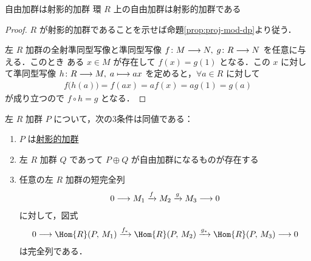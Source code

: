 \documentclass[algtopo_main]{subfiles}
\begin{document}
\begin{mycol}[label=col:free-proj]{自由加群は射影的加群}
    環 $R$ 上の自由加群は射影的加群である
\end{mycol}

\begin{proof}
    $R$ が射影的加群であることを示せば命題\ref{prop:proj-mod-dp}より従う．

    左 $R$ 加群の全射準同型写像と準同型写像 $f \colon M \longrightarrow N,\; g\colon R \longrightarrow N$ を任意に与える．このとき
    ある $x \in M$ が存在して $f(x) = g(1)$ となる．この $x$ に対して準同型写像 $h \colon R \longrightarrow M,\; a \longmapsto ax$ を定めると，$\forall a \in R$ に対して
    \begin{align}
        f \bigl( h(a) \bigr)  = f(ax) = af(x) = ag(1) = g(a)
    \end{align}
    が成り立つので $f \circ h = g$ となる．
\end{proof}

\begin{myprop}[label=prop:proj-mod-basic]{}
    左 $R$ 加群 $P$ について，次の3条件は同値である：
    \begin{enumerate}
        \item $P$ は\hyperref[def:proj-mod]{射影的加群}
        \item 左 $R$ 加群 $Q$ であって $P \oplus Q$ が自由加群になるものが存在する
        \item 任意の左 $R$ 加群の短完全列
        \begin{align}
            0 \longrightarrow M_1 \xrightarrow{f} M_2 \xrightarrow{g} M_3 \longrightarrow 0
        \end{align}
        に対して，図式
        \begin{align}
            \label{eq:prop-proj-hom}
            0 \lto \Hom{R} (P,\, M_1) \xrightarrow{f_*} \Hom{R}(P,\, M_2) \xrightarrow{g_*} \Hom{R}(P,\, M_3) \lto 0
        \end{align}
        は完全列である．
    \end{enumerate}
\end{myprop}
\end{document}
